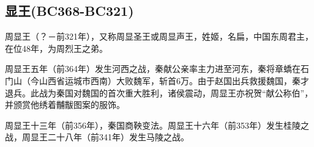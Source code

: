 
\subsection{显王{\tiny(BC368-BC321)}}

周显王（？－前321年），又称周显圣王或周显声王，姓姬，名扁，中国东周君主，在位48年，为周烈王之弟。

周显王五年（前364年）发生河西之战，秦献公亲率主力进至河东，秦将章蟜在石门山（今山西省运城市西南）大败魏军，斩首6万。由于赵国出兵救援魏国，秦才退兵。此战为秦国对魏国的首次重大胜利，诸侯震动，周显王亦祝贺“献公称伯”，并颁赏他绣着黼黻图案的服饰。

周显王十三年（前356年），秦国商鞅变法。周显王十六年（前353年）发生桂陵之战，周显王二十八年（前341年）发生马陵之战。

